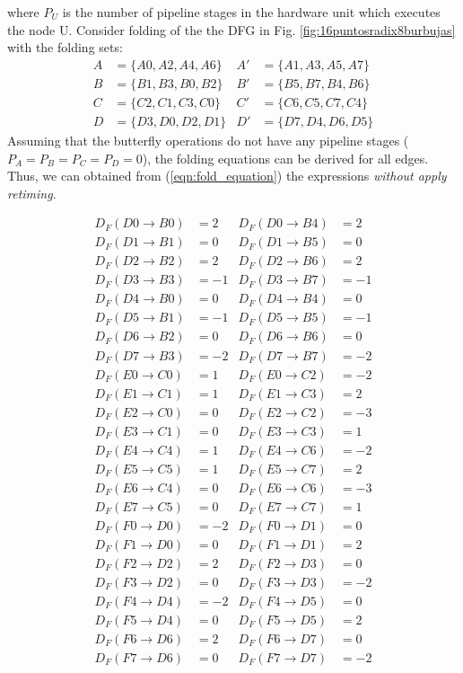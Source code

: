 \documentclass[journal,comsoc]{IEEEtran}
\begin{document}
where $P_U$ is the number of pipeline stages in the hardware unit which executes the node U.
Consider folding of the the DFG in Fig. \ref{fig:16puntosradix8burbujas} with the folding sets:
\begin{align*}%
A&= \{ A0,A2,A4,A6 \}  & A'&= \{ A1,A3,A5,A7 \} \\
B&=\{ B1,B3,B0,B2 \}   &B'&=\{ B5,B7,B4,B6 \} 	\\
C&=\{ C2,C1,C3,C0 \}   &C'&=\{ C6,C5,C7,C4 \} 	\\ 
D&=\{ D3,D0,D2,D1 \}   &D'&=\{ D7,D4,D6,D5 \}  
\end{align*}
Assuming that the butterfly operations do not have any pipeline stages ($P_A=P_B=P_C=P_D=0$), the folding equations can be derived for all edges. Thus, we can obtained from (\ref{eqn:fold_equation}) the expressions \textit{without apply retiming}.
\begin{small}
\begin{align*}
D_F(D0\to B0)&=2 &  D_F(D0\to B4)&=2\\
D_F(D1\to B1)&=0 &  D_F(D1\to B5)&=0\\
D_F(D2\to B2)&=2 &  D_F(D2\to B6)&=2\\
D_F(D3\to B3)&=-1& D_F(D3\to B7)&=-1\\
D_F(D4\to B0)&=0 &  D_F(D4\to B4)&=0\\
D_F(D5\to B1)&=-1& D_F(D5\to B5)&=-1\\
D_F(D6\to B2)&=0 &  D_F(D6\to B6)&=0\\
D_F(D7\to B3)&=-2& D_F(D7\to B7)&=-2\\
D_F(E0\to C0)&=1 &  D_F(E0\to C2)&=-2\\
D_F(E1\to C1)&=1 &  D_F(E1\to C3)&=2\\
D_F(E2\to C0)&=0 &  D_F(E2\to C2)&=-3\\
D_F(E3\to C1)&=0 &  D_F(E3\to C3)&=1\\
D_F(E4\to C4)&=1 &  D_F(E4\to C6)&=-2\\
D_F(E5\to C5)&=1 &  D_F(E5\to C7)&=2\\
D_F(E6\to C4)&=0 &  D_F(E6\to C6)&=-3\\
D_F(E7\to C5)&=0 &  D_F(E7\to C7)&=1\\
D_F(F0\to D0)&=-2& D_F(F0\to D1)&=0\\
D_F(F1\to D0)&=0 &  D_F(F1\to D1)&=2\\
D_F(F2\to D2)&=2 &  D_F(F2\to D3)&=0\\
D_F(F3\to D2)&=0 &  D_F(F3\to D3)&=-2\\
D_F(F4\to D4)&=-2&  D_F(F4\to D5)&=0\\
D_F(F5\to D4)&=0 &  D_F(F5\to D5)&=2\\
D_F(F6\to D6)&=2 &  D_F(F6\to D7)&=0\\
D_F(F7\to D6)&=0 &  D_F(F7\to D7)&=-2
\end{align*}
\end{small}
\end{document}
